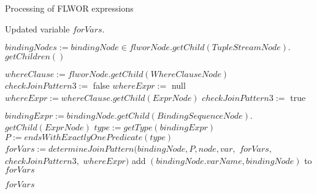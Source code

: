 \begin{algorithm}
\caption{Processing of FLWOR expressions}
\label{ALG_processing_of_flwor_expressions}
\begin{algorithmic}[1]

\ENSURE Updated variable $forVars$.

\STATE $bindingNodes := bindingNode \in flworNode.getChild(TupleStreamNode).$ $getChildren()$

\STATE $whereClause := flworNode.getChild(WhereClauseNode)$
\STATE $checkJoinPattern3 :=$ false
\STATE $whereExpr :=$ null
    \STATE $whereExpr := whereClause.getChild(ExprNode)$
        \STATE $checkJoinPattern3 :=$ true
    \ENDIF
\ENDIF

    \STATE $bindingExpr := bindingNode.getChild(BindingSequenceNode).$ $getChild(ExprNode)$
    \STATE $type := getType(bindingExpr)$
    	\STATE $P := endsWithExactlyOnePredicate(type)$
            	\STATE $forVars := determineJoinPattern(bindingNode, P, node, var,$ $forVars,$ $checkJoinPattern3,$ $whereExpr)$
        	\ENDFOR
        \ENDIF
            	\STATE add $(bindingNode.varName, bindingNode)$ to $forVars$
  	       	\ENDIF
        \ENDIF
    \ENDIF
\ENDFOR

\RETURN $forVars$
\end{algorithmic}
\end{algorithm}

